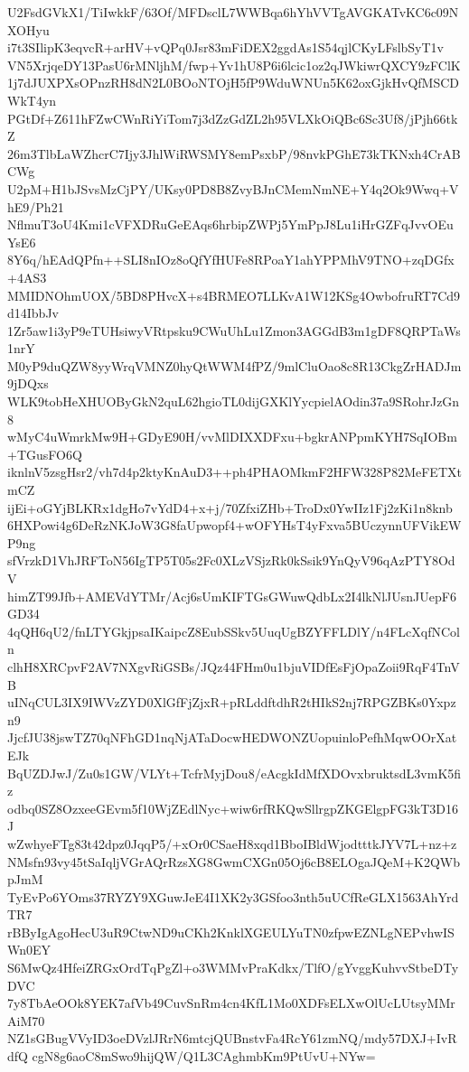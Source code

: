 U2FsdGVkX1/TiIwkkF/63Of/MFDsclL7WWBqa6hYhVVTgAVGKATvKC6c09NXOHyu
i7t3SIlipK3eqvcR+arHV+vQPq0Jsr83mFiDEX2ggdAs1S54qjlCKyLFslbSyT1v
VN5XrjqeDY13PasU6rMNljhM/fwp+Yv1hU8P6i6lcic1oz2qJWkiwrQXCY9zFClK
1j7dJUXPXsOPnzRH8dN2L0BOoNTOjH5fP9WduWNUn5K62oxGjkHvQfMSCDWkT4yn
PGtDf+Z611hFZwCWnRiYiTom7j3dZzGdZL2h95VLXkOiQBc6Sc3Uf8/jPjh66tkZ
26m3TlbLaWZhcrC7Ijy3JhlWiRWSMY8emPsxbP/98nvkPGhE73kTKNxh4CrABCWg
U2pM+H1bJSvsMzCjPY/UKsy0PD8B8ZvyBJnCMemNmNE+Y4q2Ok9Wwq+VhE9/Ph21
NflmuT3oU4Kmi1cVFXDRuGeEAqs6hrbipZWPj5YmPpJ8Lu1iHrGZFqJvvOEuYsE6
8Y6q/hEAdQPfn++SLI8nIOz8oQfYfHUFe8RPoaY1ahYPPMhV9TNO+zqDGfx+4AS3
MMIDNOhmUOX/5BD8PHvcX+s4BRMEO7LLKvA1W12KSg4OwbofruRT7Cd9d14IbbJv
1Zr5aw1i3yP9eTUHsiwyVRtpsku9CWuUhLu1Zmon3AGGdB3m1gDF8QRPTaWs1nrY
M0yP9duQZW8yyWrqVMNZ0hyQtWWM4fPZ/9mlCluOao8c8R13CkgZrHADJm9jDQxs
WLK9tobHeXHUOByGkN2quL62hgioTL0dijGXKlYycpielAOdin37a9SRohrJzGn8
wMyC4uWmrkMw9H+GDyE90H/vvMlDIXXDFxu+bgkrANPpmKYH7SqIOBm+TGusFO6Q
iknlnV5zsgHsr2/vh7d4p2ktyKnAuD3++ph4PHAOMkmF2HFW328P82MeFETXtmCZ
ijEi+oGYjBLKRx1dgHo7vYdD4+x+j/70ZfxiZHb+TroDx0YwIIz1Fj2zKi1n8knb
6HXPowi4g6DeRzNKJoW3G8faUpwopf4+wOFYHsT4yFxva5BUczynnUFVikEWP9ng
sfVrzkD1VhJRFToN56IgTP5T05s2Fc0XLzVSjzRk0kSsik9YnQyV96qAzPTY8OdV
himZT99Jfb+AMEVdYTMr/Acj6sUmKIFTGsGWuwQdbLx2I4lkNlJUsnJUepF6GD34
4qQH6qU2/fnLTYGkjpsaIKaipcZ8EubSSkv5UuqUgBZYFFLDlY/n4FLcXqfNColn
clhH8XRCpvF2AV7NXgvRiGSBs/JQz44FHm0u1bjuVIDfEsFjOpaZoii9RqF4TnVB
uINqCUL3IX9IWVzZYD0XlGfFjZjxR+pRLddftdhR2tHIkS2nj7RPGZBKs0Yxpzn9
JjcfJU38jswTZ70qNFhGD1nqNjATaDocwHEDWONZUopuinloPefhMqwOOrXatEJk
BqUZDJwJ/Zu0s1GW/VLYt+TcfrMyjDou8/eAcgkIdMfXDOvxbruktsdL3vmK5fiz
odbq0SZ8OzxeeGEvm5f10WjZEdlNyc+wiw6rfRKQwSllrgpZKGElgpFG3kT3D16J
wZwhyeFTg83t42dpz0JqqP5/+xOr0CSaeH8xqd1BboIBldWjodtttkJYV7L+nz+z
NMsfn93vy45tSaIqljVGrAQrRzsXG8GwmCXGn05Oj6cB8ELOgaJQeM+K2QWbpJmM
TyEvPo6YOms37RYZY9XGuwJeE4I1XK2y3GSfoo3nth5uUCfReGLX1563AhYrdTR7
rBByIgAgoHecU3uR9CtwND9uCKh2KnklXGEULYuTN0zfpwEZNLgNEPvhwISWn0EY
S6MwQz4HfeiZRGxOrdTqPgZl+o3WMMvPraKdkx/TlfO/gYvggKuhvvStbeDTyDVC
7y8TbAeOOk8YEK7afVb49CuvSnRm4cn4KfL1Mo0XDFsELXwOlUcLUtsyMMrAiM70
NZ1sGBugVVyID3oeDVzlJRrN6mtcjQUBnstvFa4RcY61zmNQ/mdy57DXJ+IvRdfQ
cgN8g6aoC8mSwo9hijQW/Q1L3CAghmbKm9PtUvU+NYw=

